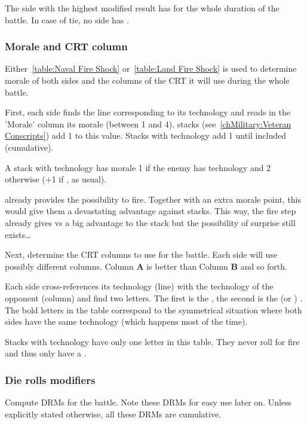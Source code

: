 The side with the highest modified result has  for the
whole duration of the battle. In case of tie, no side has .

\subsubsection{Morale and CRT column}
\label{chMilitary:Battle:Parameters:CRT}
Either~\ref{table:Naval Fire Shock} or~\ref{table:Land Fire Shock} is used to
determine morale of both sides and the columns of the CRT it will use during
the whole battle.



First, each side finds the line corresponding to its technology and reads in
the 'Morale' column its morale (between 1 and 4).  stacks
(see~\ref{chMilitary:Veteran Conscripts}) add 1 to this value. Stacks with
\TTER technology add 1 until \TARQ included (cumulative).

A stack with \TREN technology has morale 1 if the enemy has \TMED technology
and 2 otherwise (+1 if , as usual).

\begin{designnote}
  \TREN already provides the possibility to fire. Together with an extra
  morale point, this would give them a devastating advantage against \TMED
  stacks. This way, the fire step already gives \TREN vs \TMED a big advantage
  to the \TREN stack but the possibility of surprise still exists\ldots
\end{designnote}

Next, determine the CRT columns to use for the battle. Each side will use
possibly different columns. Column \textbf{A} is better than Column \textbf{B}
and so forth.

Each side cross-references its technology (line) with the technology of the
opponent (column) and find two letters. The first is the , the second is the  (or ) . The bold letters in the table correspond to the symmetrical
situation where both sides have the same technology (which happens most of the
time).

Stacks with \TMED technology have only one letter in this table. They never
roll for fire and thus only have a .

\subsubsection{Die rolls modifiers}
\label{chMilitary:Battle:Parameters:DRM}
Compute DRMs for the battle. Note these DRMs for easy use later on. Unless
explicitly stated otherwise, all these DRMs are cumulative.

